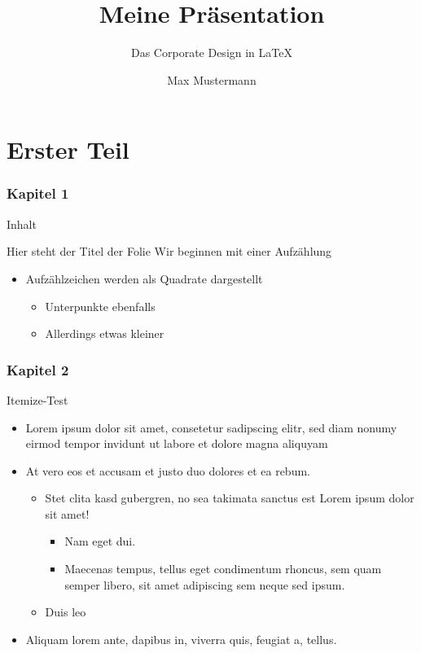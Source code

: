 \documentclass[fleqn,11pt]{beamer}
\title{Meine Pr\"asentation}
\subtitle{Das Corporate Design in  \LaTeX}
\author{Max Mustermann}
\begin{document}
\begin{frame}[plain]
\titlepage
\end{frame}

\part{Erster Teil}

\begin{frame}[plain]
  \partpage
\end{frame}


\section{Kapitel 1}

\begin{frame}{Inhalt}
\tableofcontents
\end{frame}

\begin{frame}{Hier steht der Titel der Folie}
Wir beginnen mit einer Aufzählung
\begin{itemize}
  \item Aufzählzeichen werden als Quadrate dargestellt
  \begin{itemize}
    \item Unterpunkte ebenfalls
    \item Allerdings etwas kleiner
  \end{itemize}
\end{itemize}
\end{frame}

\section{Kapitel 2}


\begin{frame}{Itemize-Test}
  \begin{itemize}
    \item Lorem ipsum dolor sit amet, consetetur sadipscing elitr, sed diam
      nonumy eirmod tempor invidunt ut labore et dolore magna aliquyam
    \item At vero eos et accusam et justo duo dolores et ea rebum.
      \begin{itemize}
        \item Stet clita kasd gubergren, no sea takimata sanctus est Lorem ipsum
          dolor sit amet!
          \begin{itemize}
            \item Nam eget dui.
            \item Maecenas tempus, tellus eget condimentum rhoncus, sem quam
              semper libero, sit amet adipiscing sem neque sed ipsum.
          \end{itemize}
        \item Duis leo
      \end{itemize}
    \item Aliquam lorem ante, dapibus in, viverra quis, feugiat a, tellus. 
  \end{itemize}
\end{frame}
\end{document}
